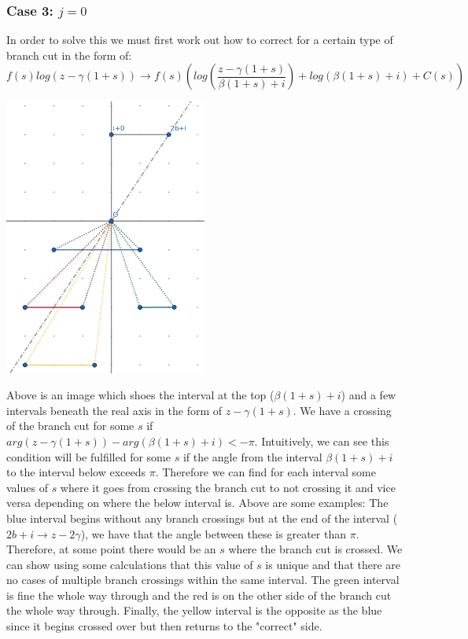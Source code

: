 \documentclass{article}
\begin{document}
\subsubsection{Case 3: $j=0$}
In order to solve this we must first work out how to correct for a certain type of branch cut in the form of:
$$f(s)log(z-\gamma(1+s)) \rightarrow f(s)(log(\frac{z-\gamma(1+s)}{\beta(1+s)+i})+log(\beta(1+s)+i)+C(s))$$
\begin{center}\includegraphics[width=0.5\textwidth]{bsi}\end{center}
Above is an image which shoes the interval at the top ($\beta(1+s)+i$) and a few intervals beneath the real axis in the form of $z-\gamma(1+s)$.
We have a crossing of the branch cut for some $s$ if $arg(z-\gamma(1+s))-arg(\beta(1+s)+i)<-\pi$.
Intuitively, we can see this condition will be fulfilled for some $s$ if the angle from the interval $\beta(1+s)+i$ to the interval below exceeds $\pi$.
Therefore we can find for each interval some values of $s$ where it goes from crossing the branch cut to not crossing it and vice versa depending on where the below interval is.
Above are some examples: The blue interval begins without any branch crossings but at the end of the interval ($2b+i\rightarrow z-2\gamma$), we have that the angle between these is greater than $\pi$.
Therefore, at some point there would be an $s$ where the branch cut is crossed.
We can show using some calculations that this value of $s$ is unique and that there are no cases of multiple branch crossings within the same interval.
The green interval is fine the whole way through and the red is on the other side of the branch cut the whole way through.
Finally, the yellow interval is the opposite as the blue since it begins crossed over but then returns to the "correct" side.
\end{document}
